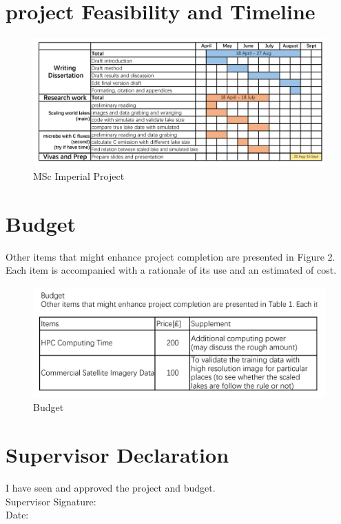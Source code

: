 \section{project Feasibility and Timeline}
\begin{figure}[H]
    \centering
    \includegraphics[scale=0.4]{introduction/Figure1.png}
    \caption{MSc Imperial Project}
    \label{Fig.1}
\end{figure}

\section{Budget}
Other items that might enhance project completion are presented in Figure 2. Each item is accompanied with a rationale of its use and an estimated of cost. 

\begin{figure}[H]
    \centering
    \includegraphics[scale=0.3]{introduction/Figure2.png}
    \caption{Budget}
    \label{Fig.2}
\end{figure}

\section{Supervisor Declaration}
\large{I have seen and approved the project and budget.}
\\
\large{Supervisor Signature:}     
\\
\large{Date:}


